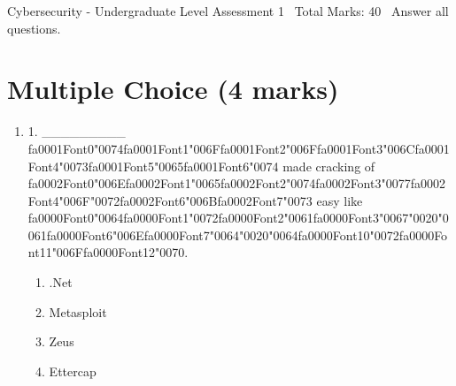 \documentclass[12pt]{article}
\begin{document}
\begin{center}
Cybersecurity - Undergraduate Level Assessment 1 \
Total Marks: 40 \
Answer all questions.
\end{center}

\section*{Multiple Choice (4 marks)}
\begin{enumerate}[label=\arabic*.]
\item 1. \_\_\_\_\_\_\_\_\_ {\csname fa0001Font0\endcsname\char"0074}{\csname fa0001Font1\endcsname\char"006F}{\csname fa0001Font2\endcsname\char"006F}{\csname fa0001Font3\endcsname\char"006C}{\csname fa0001Font4\endcsname\char"0073}{\csname fa0001Font5\endcsname\char"0065}{\csname fa0001Font6\endcsname\char"0074} made cracking of {\csname fa0002Font0\endcsname\char"006E}{\csname fa0002Font1\endcsname\char"0065}{\csname fa0002Font2\endcsname\char"0074}{\csname fa0002Font3\endcsname\char"0077}{\csname fa0002Font4\endcsname\char"006F}{\char"0072}{\csname fa0002Font6\endcsname\char"006B}{\csname fa0002Font7\endcsname\char"0073} easy like {\csname fa0000Font0\endcsname\char"0064}{\csname fa0000Font1\endcsname\char"0072}{\csname fa0000Font2\endcsname\char"0061}{\csname fa0000Font3\endcsname\char"0067}{\char"0020}{\char"0061}{\csname fa0000Font6\endcsname\char"006E}{\csname fa0000Font7\endcsname\char"0064}{\char"0020}{\char"0064}{\csname fa0000Font10\endcsname\char"0072}{\csname fa0000Font11\endcsname\char"006F}{\csname fa0000Font12\endcsname\char"0070}.
\begin{enumerate}[label=(\alph*)]
    \item .Net
    \item Metasploit
    \item Zeus
    \item Ettercap
\end{enumerate}

\end{enumerate}
\end{document}
